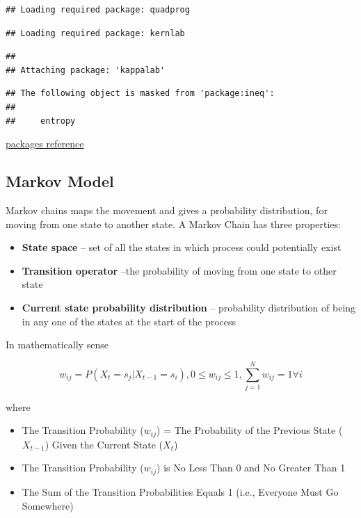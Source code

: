 \documentclass[
]{book}
\providecommand{\tightlist}{%
  \setlength{\itemsep}{0pt}\setlength{\parskip}{0pt}}
\begin{document}
\begin{verbatim}
## Loading required package: quadprog
\end{verbatim}

\begin{verbatim}
## Loading required package: kernlab
\end{verbatim}

\begin{verbatim}
## 
## Attaching package: 'kappalab'
\end{verbatim}

\begin{verbatim}
## The following object is masked from 'package:ineq':
## 
##     entropy
\end{verbatim}

\href{https://cran.r-project.org/web/packages/GameTheory/vignettes/GameTheory.pdf}{packages reference}

\hypertarget{markov-model}{%
\subsection{Markov Model}\label{markov-model}}

Markov chains maps the movement and gives a probability distribution, for moving from one state to another state. A Markov Chain has three properties:

\begin{itemize}
\tightlist
\item
  \textbf{State space} -- set of all the states in which process could potentially exist
\item
  \textbf{Transition operator} --the probability of moving from one state to other state
\item
  \textbf{Current state probability distribution} -- probability distribution of being in any one of the states at the start of the process
\end{itemize}

In mathematically sense

\[
w_{ij}= P(X_t = s_j|X_{t-1}=s_i),0 \le w_{ij} \le 1, \sum_{j=1}^N w_{ij} =1 \forall i
\]

where

\begin{itemize}
\tightlist
\item
  The Transition Probability (\(w_{ij}\)) = The Probability of the Previous State ( \(X_{t-1}\)) Given the Current State (\(X_t\))
\item
  The Transition Probability (\(w_{ij}\)) is No Less Than 0 and No Greater Than 1
\item
  The Sum of the Transition Probabilities Equals 1 (i.e., Everyone Must Go Somewhere)
\end{itemize}
\end{document}
